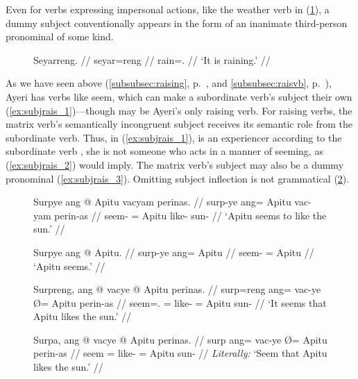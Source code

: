 Even for verbs expressing impersonal actions, like the weather verb in
(\ref{ex:weatherverb}), a dummy subject conventionally appears in the form of
an inanimate third-person pronominal of some kind.

\begin{figure}[h]
\ex\label{ex:weatherverb}
\begingl
	\gla Seyarreng. //
	\glb seyar=reng //
	\glc rain=\TsgI{}.\Aarg{} //
	\glft `It is raining.' //
\endgl\xe
\end{figure}

As we have seen above (\autoref{subsubsec:raising},
p.~\pageref{subsubsec:raising}, and \autoref{subsubsec:raisvb},
p.~\pageref{subsubsec:raisvb}), Ayeri has verbs like 
{seem}, which can make a subordinate verb's subject their own
(\ref{ex:subjrais_1})---though  may be Ayeri's only
raising verb. For raising verbs, the matrix verb's semantically incongruent
subject receives its semantic role from the subordinate verb. Thus, in
(\ref{ex:subjrais_1}),  is an experiencer according to the
subordinate verb , she is not someone who acts in
a manner of seeming, as (\ref{ex:subjrais_2}) would imply. The matrix verb's
subject may also be a dummy pronominal (\ref{ex:subjrais_3}). Omitting subject
inflection is not grammatical (\ref{ex:subjrais_4}).

\begin{figure}
\pex\label{ex:subjrais}
\a\label{ex:subjrais_1}\begingl
	\gla Surpye ang @ Apitu vacyam perinas. //
	\glb surp-ye ang= Apitu vac-yam perin-as //
	\glc seem-\TsgF{} \Aarg{}= Apitu like-\Ptcp{} sun-\Parg{} //
	\glft `Apitu seems to like the sun.' //
\endgl

\a\label{ex:subjrais_2}\ljudge*\begingl
	\gla Surpye ang @ Apitu. //
	\glb surp-ye ang= Apitu //
	\glc seem-\TsgF{} \Aarg{}= Apitu //
	\glft `Apitu seems.' //
\endgl

\a\label{ex:subjrais_3}\begingl
	\gla Surpreng, ang @ vacye {} @ Apitu perinas. //
	\glb surp=reng ang= vac-ye Ø= Apitu perin-as //
	\glc seem=\TsgI{}.\Aarg{} \AgtT{}= like-\TsgF{} \Top{}= Apitu 
		sun-\Parg{} //
	\glft `It seems that Apitu likes the sun.' //
\endgl

\a\label{ex:subjrais_4}\ljudge*\begingl
	\gla Surpa, ang @ vacye {} @ Apitu perinas. //
	\glb surp ang= vac-ye Ø= Apitu perin-as //
	\glc seem \AgtT{}= like-\TsgF{} \Top{}= Apitu sun-\Parg{} //
	\glft \textit{Literally:} `Seem that Apitu likes the sun.' //
\endgl

\xe
\end{figure}

